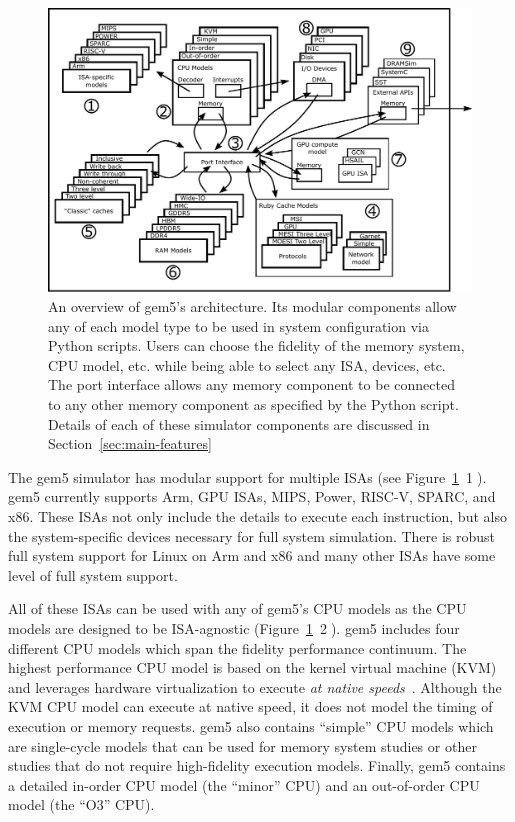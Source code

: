\begin{figure}
  \centering
  \includegraphics[width=\textwidth]{fig/gem5-big-picture}
  \caption{An overview of gem5's architecture. Its modular components allow any of each model type to be used in system configuration via Python scripts. Users can choose the fidelity of the memory system, CPU model, etc. while being able to select any ISA, devices, etc. The port interface allows any memory component to be connected to any other memory component as specified by the Python script. Details of each of these simulator components are discussed in Section~\ref{sec:main-features}}
  \label{fig:gem5-big-picture}
\end{figure}

The gem5 simulator has modular support for multiple ISAs (see Figure~\ref{fig:gem5-big-picture}~\textcircled{1}).
gem5 currently supports Arm, GPU ISAs, MIPS, Power, RISC-V, SPARC, and x86.
These ISAs not only include the details to execute each instruction, but also the system-specific devices necessary for full system simulation.
There is robust full system support for Linux on Arm and x86 and many other ISAs have some level of full system support.

All of these ISAs can be used with any of gem5's CPU models as the CPU models are designed to be ISA-agnostic (Figure~\ref{fig:gem5-big-picture}~\textcircled{2}).
gem5 includes four different CPU models which span the fidelity performance continuum.
The highest performance CPU model is based on the kernel virtual machine (KVM) and leverages hardware virtualization to execute \emph{at native speeds}~\cite{full-speed-ahead}.
Although the KVM CPU model can execute at native speed, it does not model the timing of execution or memory requests.
gem5 also contains ``simple'' CPU models which are single-cycle models that can be used for memory system studies or other studies that do not require high-fidelity execution models.
Finally, gem5 contains a detailed in-order CPU model (the ``minor'' CPU) and an out-of-order CPU model (the ``O3'' CPU).

